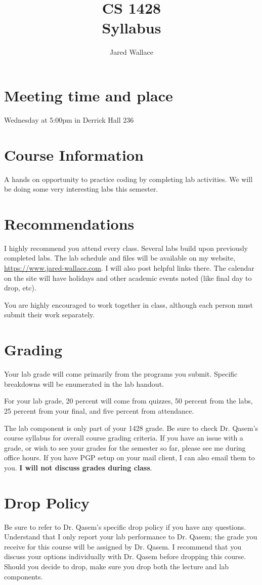 \documentclass[letterpaper,12pt]{article}
\title{\Large CS 1428\\Syllabus}
\author{Jared Wallace}
\date{}
\begin{document}
\maketitle

\vspace{30mm}

\section*{Meeting time and place}
Wednesday at 5:00pm in Derrick Hall 236

\section*{Course Information}
A hands on opportunity to practice coding by completing lab activities.
We will be doing some very interesting labs this semester.
\section*{Recommendations}
I highly recommend you attend every class. Several labs build upon previously completed
labs. The lab schedule and files will be available on my website, \url{https://www.jared-wallace.com}.
I will also post helpful links there. The calendar on the site will have holidays and
other academic events noted (like final day to drop, etc).

You are highly encouraged to work together in class, although each person must
submit their work separately.

\section*{Grading}
Your lab grade will come primarily from the programs you submit. Specific breakdowns
will be enumerated in the lab handout.

For your lab grade, 20 percent will come from quizzes, 50 percent from the labs,
25 percent from your final, and five percent from attendance.

The lab component is only part of your 1428 grade. Be sure to
check Dr. Qasem's course syllabus for overall course grading criteria. If
you have an issue with a grade, or wish to see your grades for the semester so far,
please see me during office hours. If you have PGP setup on your mail client,
I can also email them to you. \textbf{I will not discuss grades during class}.

\section*{Drop Policy}
Be sure to refer to Dr. Qasem's specific drop policy if you have any
questions. Understand that I only report your lab performance to Dr. Qasem;
the grade you receive for this course will be assigned by Dr. Qasem.
I recommend that you discuss your options individually with Dr. Qasem
before dropping this course. Should you decide to drop, make sure you
drop both the lecture and lab components.
\end{document}
